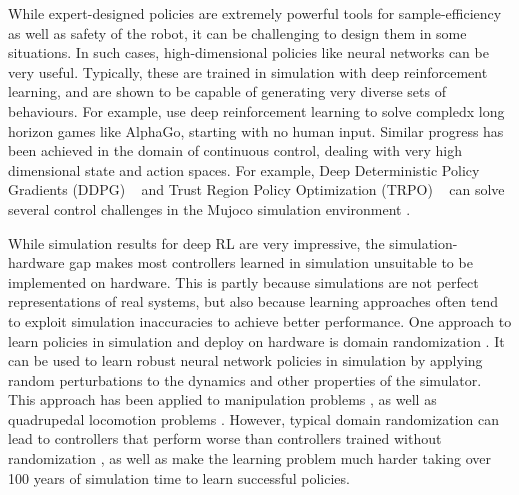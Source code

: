 While expert-designed policies are extremely powerful tools for sample-efficiency as well as safety of the robot, it can be challenging to design them in some situations. In such cases, high-dimensional policies like neural networks can be very useful. Typically, these are trained in simulation with deep reinforcement learning, and are shown to be capable of generating very diverse sets of behaviours. For example, \cite{silver2016mastering} use deep reinforcement learning to solve compledx long horizon games like AlphaGo, starting with no human input. Similar progress has been achieved in the domain of continuous control, dealing with very high dimensional state and action spaces. For example, Deep Deterministic Policy Gradients (DDPG) ~\cite{lillicrap2015continuous} and Trust Region Policy Optimization  (TRPO) ~\cite{schulman2015trust} can solve several control challenges in the Mujoco simulation environment \cite{todorov2012mujoco}. %

While simulation results for deep RL are very impressive, the simulation-hardware gap makes most controllers learned in simulation unsuitable to be implemented on hardware. This is partly because simulations are not perfect representations of real systems, but also because learning approaches often tend to exploit simulation inaccuracies to achieve better performance. 
One approach to learn policies in simulation and deploy on hardware is domain randomization \cite{mordatch2015ensemble}. It can be used to learn robust neural network policies in simulation by applying random perturbations to the dynamics and other properties of the simulator. This approach has been applied to manipulation problems \cite{peng2017sim}, as well as quadrupedal locomotion problems \cite{tan2018sim}. However, typical domain randomization can lead to controllers that perform worse than controllers trained without randomization \citep{tan2018sim}, as well as make the learning problem much harder \citep{2018arXiv180800177O} taking over 100 years of simulation time to learn successful policies.   

